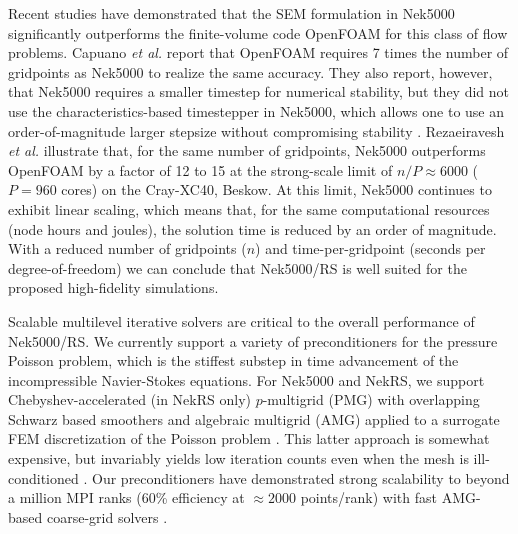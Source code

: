 Recent studies
have demonstrated that the SEM formulation in Nek5000 significantly outperforms
the finite-volume code OpenFOAM for this class of flow problems.  Capuano {\em
et al.} \cite{capuano19} report that OpenFOAM requires 7 times the number of
gridpoints as Nek5000 to realize the same accuracy.  They also report, however,
that Nek5000 requires a smaller timestep for numerical stability, but they did
not use the characteristics-based timestepper in Nek5000, which allows one to
use an order-of-magnitude larger stepsize without compromising stability
\cite{patel18}.  Rezaeiravesh {\em et al.} \cite{schlatter21} illustrate that,
for the same number of gridpoints, Nek5000 outperforms OpenFOAM by a factor
of 12 to 15 at the strong-scale limit of $n/P \approx 6000$ ($P=960$ cores) on
the Cray-XC40, Beskow.  At this limit, Nek5000 continues to exhibit linear
scaling, which means that, for the same computational resources (node hours and
joules), the solution time is reduced by an order of magnitude.  With a reduced
number of gridpoints ($n$) and time-per-gridpoint (seconds per
degree-of-freedom) we can conclude that Nek5000/RS is well suited for the 
proposed high-fidelity simulations.

Scalable multilevel iterative solvers are critical to the overall performance
of Nek5000/RS.   We currently support a variety of preconditioners for the
pressure Poisson problem, which is the stiffest substep in time advancement of
the incompressible Navier-Stokes equations.  For Nek5000 and NekRS, we support
Chebyshev-accelerated (in NekRS only) $p$-multigrid (PMG) with overlapping
Schwarz based smoothers \cite{lottes05,nekrs} and algebraic multigrid (AMG)
applied to a surrogate FEM discretization of the Poisson problem
\cite{pedro19,sao80}.  This latter approach is somewhat expensive, but
invariably yields low iteration counts even when the mesh is ill-conditioned
\cite{fischer97}.  Our preconditioners have demonstrated strong scalability to
beyond a million MPI ranks (60\% efficiency at $\approx 2000$ points/rank) with
fast AMG-based coarse-grid solvers \cite{fischer15}.


